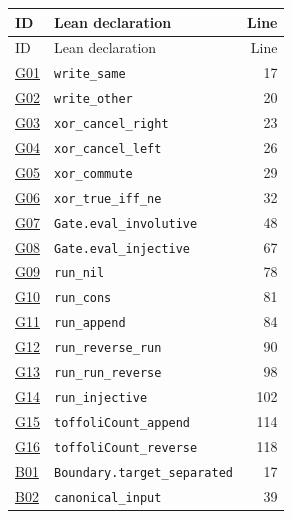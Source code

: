 \documentclass[11pt,letterpaper]{article}
\begin{document}
\begin{longtable}{@{}p{.39in}p{4.52in}r@{}}
\toprule
ID & Lean declaration & Line\\\midrule\endfirsthead
\toprule ID & Lean declaration & Line\\\midrule\endhead
\bottomrule\endfoot
\hyperlink{G01}{G01} & {\fontsize{8.9}{10.8}\selectfont\nolinkurl{write_same}} & 17\\
\hyperlink{G02}{G02} & {\fontsize{8.9}{10.8}\selectfont\nolinkurl{write_other}} & 20\\
\hyperlink{G03}{G03} & {\fontsize{8.9}{10.8}\selectfont\nolinkurl{xor_cancel_right}} & 23\\
\hyperlink{G04}{G04} & {\fontsize{8.9}{10.8}\selectfont\nolinkurl{xor_cancel_left}} & 26\\
\hyperlink{G05}{G05} & {\fontsize{8.9}{10.8}\selectfont\nolinkurl{xor_commute}} & 29\\
\hyperlink{G06}{G06} & {\fontsize{8.9}{10.8}\selectfont\nolinkurl{xor_true_iff_ne}} & 32\\
\hyperlink{G07}{G07} & {\fontsize{8.9}{10.8}\selectfont\nolinkurl{Gate.eval_involutive}} & 48\\
\hyperlink{G08}{G08} & {\fontsize{8.9}{10.8}\selectfont\nolinkurl{Gate.eval_injective}} & 67\\
\hyperlink{G09}{G09} & {\fontsize{8.9}{10.8}\selectfont\nolinkurl{run_nil}} & 78\\
\hyperlink{G10}{G10} & {\fontsize{8.9}{10.8}\selectfont\nolinkurl{run_cons}} & 81\\
\hyperlink{G11}{G11} & {\fontsize{8.9}{10.8}\selectfont\nolinkurl{run_append}} & 84\\
\hyperlink{G12}{G12} & {\fontsize{8.9}{10.8}\selectfont\nolinkurl{run_reverse_run}} & 90\\
\hyperlink{G13}{G13} & {\fontsize{8.9}{10.8}\selectfont\nolinkurl{run_run_reverse}} & 98\\
\hyperlink{G14}{G14} & {\fontsize{8.9}{10.8}\selectfont\nolinkurl{run_injective}} & 102\\
\hyperlink{G15}{G15} & {\fontsize{8.9}{10.8}\selectfont\nolinkurl{toffoliCount_append}} & 114\\
\hyperlink{G16}{G16} & {\fontsize{8.9}{10.8}\selectfont\nolinkurl{toffoliCount_reverse}} & 118\\
\hyperlink{B01}{B01} & {\fontsize{8.9}{10.8}\selectfont\nolinkurl{Boundary.target_separated}} & 17\\
\hyperlink{B02}{B02} & {\fontsize{8.9}{10.8}\selectfont\nolinkurl{canonical_input}} & 39\\

\end{longtable}
\end{document}
